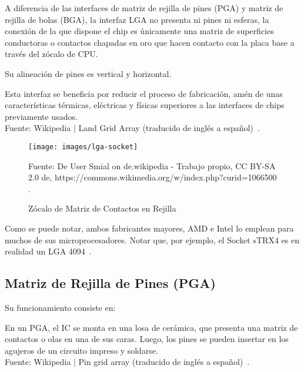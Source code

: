 \documentclass[conference]{IEEEtran}
\begin{document}
    \begin{displayquote}
        A diferencia de las interfaces de matriz de rejilla de pines (PGA) y
        matriz de rejilla de bolas (BGA), la interfaz LGA no presenta ni
        pines ni esferas, la conexión de la que dispone el chip es únicamente
        una matriz de superficies conductoras o contactos chapadas en oro que
        hacen contacto con la placa base a través del zócalo de CPU.

        \bigbreak

        Su alineación de pines es vertical y horizontal.

        \bigbreak

        Esta interfaz se beneficia por reducir el proceso de fabricación,
        amén de unas características térmicas, eléctricas y físicas
        superiores a las interfaces de chips previamente usados.\\
        \small
        Fuente: Wikipedia $\mid$ Land Grid Array (traducido de inglés a
        español)~\cite{wikipedia-lga-2021D}.
    \end{displayquote}

    \begin{figure}[H]
        \centering
        \texttt{[image: images/lga-socket]}
        \caption{Zócalo de Matriz de Contactos en Rejilla} \footnotesize
        Fuente: De User Smial on de.wikipedia - Trabajo propio, CC BY-SA 2.0
        de, https://commons.wikimedia.org/w/index.php?curid=1066500
        \cite{wikipedia-lga-2021D}.\label{fig:figure2}
    \end{figure}

    \bigbreak

    Como se puede notar, ambos fabricantes mayores, AMD e Intel lo emplean
    para muchos de sus microprocesadores. Notar que, por ejemplo, el Socket
    sTRX4 es en realidad un LGA 4094~\cite{wikipedia-lga-2021D}.

    \subsection{Matriz de Rejilla de Pines (PGA)}\label{subsec:matriz-de
    -rejilla-de-pines-(pga)}

    Su funcionamiento consiste en:

    \bigbreak

    \begin{displayquote}
        En un PGA, el IC se monta en una losa de cerámica, que presenta una
        matriz de contactos o olas en una de sus caras. Luego, los pines se
        pueden insertar en los agujeros de un circuito impreso y soldarse.\\
        \small
        Fuente: Wikipedia $\mid$ Pin grid array (traducido de inglés a
        español)~\cite{wikipedia-pga-2021C}.
    \end{displayquote}
\end{document}
